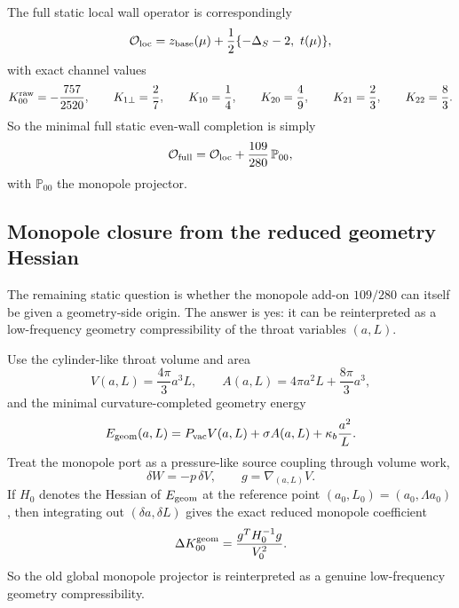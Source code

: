 \documentclass[11pt]{article}
\begin{document}
The full static local wall operator is correspondingly
\begin{equation}
\mathcal O_{\rm loc}
=
z_{\rm base}(\mu)+\frac12\{-\Delta_S-2,\ t(\mu)\},
\label{eq:family1-Oloc}
\end{equation}
with exact channel values
\begin{equation}
K_{00}^{\rm raw}=-\frac{757}{2520},
\qquad
K_{1\perp}=\frac27,
\qquad
K_{10}=\frac14,
\qquad
K_{20}=\frac49,
\qquad
K_{21}=\frac23,
\qquad
K_{22}=\frac83.
\label{eq:family1-Oloc-channels}
\end{equation}
So the minimal full static even-wall completion is simply
\begin{equation}
\mathcal O_{\rm full}
=
\mathcal O_{\rm loc}+\frac{109}{280}\,\mathbb P_{00},
\label{eq:family1-Ofull}
\end{equation}
with \(\mathbb P_{00}\) the monopole projector.

\subsection{Monopole closure from the reduced geometry Hessian}
\label{app:family1-geom}

The remaining static question is whether the monopole add-on
\(109/280\) can itself be given a geometry-side origin.  The answer is yes: it can be
reinterpreted as a low-frequency geometry compressibility of the throat variables
\((a,L)\).

Use the cylinder-like throat volume and area
\begin{equation}
V(a,L)=\frac{4\pi}{3}a^3L,
\qquad
A(a,L)=4\pi a^2L+\frac{8\pi}{3}a^3,
\label{eq:family1-VA}
\end{equation}
and the minimal curvature-completed geometry energy
\begin{equation}
E_{\rm geom}(a,L)
=
P_{\rm vac}V(a,L)+\sigma A(a,L)+\kappa_b\frac{a^2}{L}.
\label{eq:family1-Egeom}
\end{equation}
Treat the monopole port as a pressure-like source coupling through volume work,
\begin{equation}
\delta W=-p\,\delta V,
\qquad
g=\nabla_{(a,L)}V.
\label{eq:family1-volume-work}
\end{equation}
If \(H_0\) denotes the Hessian of \(E_{\rm geom}\) at the reference point
\((a_0,L_0)=(a_0,\Lambda a_0)\), then integrating out \((\delta a,\delta L)\) gives the
exact reduced monopole coefficient
\begin{equation}
\Delta K_{00}^{\rm geom}=\frac{g^T H_0^{-1}g}{V_0^2}.
\label{eq:family1-DeltaK00geom}
\end{equation}
So the old global monopole projector is reinterpreted as a genuine low-frequency geometry
compressibility.
\end{document}
